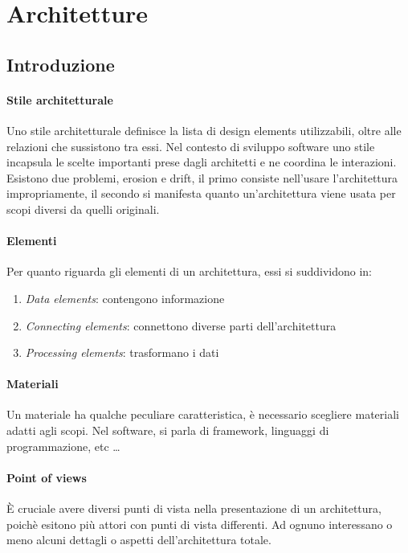 \section{Architetture}
\subsection{Introduzione}

\paragraph{Stile architetturale}
Uno stile architetturale definisce la lista di design elements utilizzabili, 
oltre alle relazioni che sussistono tra essi. Nel contesto di sviluppo software 
uno stile incapsula le scelte importanti prese dagli architetti e ne coordina le 
interazioni.
Esistono due problemi, erosion e drift, il primo consiste nell'usare l'architettura 
impropriamente, il secondo si manifesta quanto un'architettura viene usata per scopi 
diversi da quelli originali.

\paragraph{Elementi}
Per quanto riguarda gli elementi di un architettura, essi si suddividono in:
\begin{enumerate}
    \item \emph{Data elements}: contengono informazione
    \item \emph{Connecting elements}: connettono diverse parti dell'architettura
    \item \emph{Processing elements}: trasformano i dati
\end{enumerate}

\paragraph{Materiali}
Un materiale ha qualche peculiare caratteristica, è necessario scegliere materiali
adatti agli scopi. Nel software, si parla di framework, linguaggi di programmazione, etc \dots

\paragraph{Point of views}
È cruciale avere diversi punti di vista nella presentazione di un architettura, poichè 
esitono più attori con punti di vista differenti.
Ad ognuno interessano o meno alcuni dettagli o aspetti dell'architettura totale.

